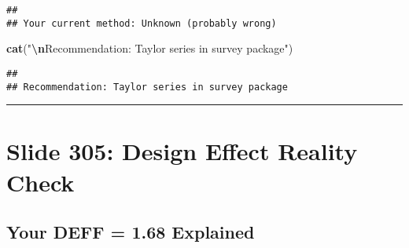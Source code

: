 \documentclass[
]{article}
\newenvironment{Shaded}{\begin{snugshade}}{\end{snugshade}}
\newcommand{\FunctionTok}[1]{\textcolor[rgb]{0.13,0.29,0.53}{\textbf{#1}}}
\newcommand{\NormalTok}[1]{#1}
\newcommand{\SpecialCharTok}[1]{\textcolor[rgb]{0.81,0.36,0.00}{\textbf{#1}}}
\newcommand{\StringTok}[1]{\textcolor[rgb]{0.31,0.60,0.02}{#1}}
\begin{document}
\begin{verbatim}
## 
## Your current method: Unknown (probably wrong)
\end{verbatim}

\begin{Shaded}
\begin{Highlighting}[]
\FunctionTok{cat}\NormalTok{(}\StringTok{"}\SpecialCharTok{\textbackslash{}n}\StringTok{Recommendation: Taylor series in survey package"}\NormalTok{)}
\end{Highlighting}
\end{Shaded}

\begin{verbatim}
## 
## Recommendation: Taylor series in survey package
\end{verbatim}

\begin{center}\rule{0.5\linewidth}{0.5pt}\end{center}

\section{Slide 305: Design Effect Reality
Check}\label{slide-305-design-effect-reality-check}

\subsection{Your DEFF = 1.68 Explained}\label{your-deff-1.68-explained}
\end{document}
